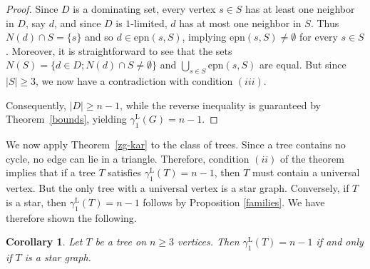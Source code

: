 \documentclass[11pt]{article}
\newtheorem{corollary}[theorem]{Corollary}
\newcommand{\gr}[1]{{\color{blue}#1}}
\newcommand{\epn}{\mbox{epn}}
\newcommand{\gammaenaL}{\gamma_1^{\mathrm L}}
\begin{document}
\begin{proof}
Since $D$ is a dominating set,
every vertex $s\in S$ has at least one neighbor in $D$, say  $d$, and since $D$ is $1$-limited, $d$ has at most one neighbor
in $S$. Thus $N(d)\cap S=\{s\}$ and so $d\in \epn(s,S)$, implying $\epn(s,S)\neq\emptyset$
for every $s\in S$.
Moreover, it is straightforward to see that the sets 
$N(S)=\{d\in D ; N(d)\cap S\neq\emptyset\}$ and $ \bigcup_{s\in S}\epn(s,S)$ are equal.
But since $|S|\ge 3$, we now have a contradiction with condition $(iii)$.

Consequently, $|D| \ge n - 1$, while the reverse inequality is guaranteed by Theorem~\ref{bounds}, yielding $\gamma^{\mathrm L}_1(G) = n - 1$.
\end{proof}


We now apply Theorem~\ref{zg-kar} to the class of trees. Since a tree contains no cycle, no edge can lie in a triangle. Therefore, condition $(ii)$ of the theorem implies that if a tree $T$ satisfies $\gammaenaL(T)=n-1$, then $T$ must contain a universal vertex. But the only tree with a universal vertex is a star graph. Conversely, if $T$ is a star, then $\gammaenaL(T)=n-1$ follows by Proposition \ref{families}. We have therefore shown the following.

\begin{corollary}\label{k=1:star}
Let $T$ be a tree on $n\geq 3$ vertices. Then $\gammaenaL(T)=n-1$ if and only if $T$ is a star graph.  
\end{corollary}


\end{document}
